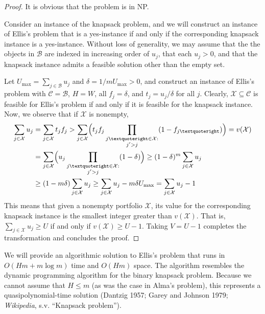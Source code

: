 \documentclass[12pt]{article} %
\theoremstyle{definition}
\theoremstyle{definition}
\begin{document}
\begin{proof}It is obvious that the problem is in NP.

Consider an instance of the knapsack problem, and we will construct an instance of Ellis’s problem that is a yes-instance if and only if the corresponding knapsack instance is a yes-instance. Without loss of generality, we may assume that the the objects in $\mathcal{B}$ are indexed in increasing order of $u_j$, that each $u_j >0$, and that the knapsack instance admits a feasible solution other than the empty set. 

Let $U_{\mathrm{max}} = \sum_{j \in \mathcal{B}} u_j$ and $\delta = {1} /{m U_{\mathrm{max}}} > 0$, and construct an instance of Ellis’s problem with $\mathcal{C} = \mathcal{B}$, $H = W$, all $f_j = \delta$, and $t_j = u_j / \delta$ for all $j$. Clearly, $\mathcal{X} \subseteq \mathcal{C}$ is feasible for Ellis’s problem if and only if it is feasible for the knapsack instance. Now, we observe that if $\mathcal{X}$ is nonempty,
\begin{align}
\begin{split}
\sum_{j \in \mathcal{X}} u_j &=  \sum_{j \in \mathcal{X}} t_j f_j 
> \sum_{j \in \mathcal{X}} \Bigl( t_j f_j  \prod_{\substack{j’ \in \mathcal{X}: \\ j' > j}} (1 - f_{j’}) \Bigr)
= v(\mathcal{X}) \\
&= \sum_{j \in \mathcal{X}} \Bigl( u_j  \prod_{\substack{j’ \in \mathcal{X}: \\ j' > j}} (1 - \delta) \Bigr)
\geq (1 - \delta)^m \sum_{j \in \mathcal{X}} u_j \\
&\geq (1 - m\delta) \sum_{j \in \mathcal{X}} u_j 
\geq \sum_{j \in \mathcal{X}} u_j  - m\delta U_{\mathrm{max}}
= \sum_{j \in \mathcal{X}} u_j  - 1
\end{split}
\end{align}
This means that given a nonempty portfolio $\mathcal{X}$, its value for the corresponding knapsack instance is the smallest integer greater than $v( \mathcal{X})$. That is, $\sum_{j \in \mathcal{X}} u_j \geq U$ if and only if $v(\mathcal{X}) \geq U -1$. Taking $V = U-1$ completes the transformation and concludes the proof.  \end{proof}


We will provide an algorithmic solution to Ellis's problem that runs in $O(Hm + m\log m)$ time and $O(Hm)$ space. The algorithm resembles the dynamic programming algorithm for the binary knapsack problem. Because we cannot assume that $H \leq m$ (as was the case in Alma's problem), this represents a quasipolynomial-time solution (Dantzig 1957; Garey and Johnson 1979; \emph{Wikipedia}, s.v. ``Knapsack problem'').
\end{document}
